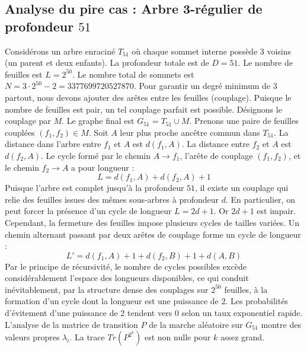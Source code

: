 \documentclass[11pt,a4paper]{article}
\begin{document}
\subsection{Analyse du pire cas : Arbre 3-régulier de profondeur $51$}
Considérons un arbre enraciné $T_{51}$ où chaque sommet interne possède 3 voisins (un parent et deux enfants).
La profondeur totale est de $D = 51$.
Le nombre de feuilles est $L = 2^{50}$.
Le nombre total de sommets est $N = 3 \cdot 2^{50} - 2 = 3377699720527870$.
Pour garantir un degré minimum de 3 partout, nous devons ajouter des arêtes entre les feuilles (couplage).
Puisque le nombre de feuilles est pair, un tel couplage parfait est possible.
Désignons le couplage par $M$. Le graphe final est $G_{51} = T_{51} \cup M$.
Prenons une paire de feuilles couplées $(f_1, f_2) \in M$.
Soit $A$ leur plus proche ancêtre commun dans $T_{51}$.
La distance dans l'arbre entre $f_1$ et $A$ est $d(f_1, A)$.
La distance entre $f_2$ et $A$ est $d(f_2, A)$.
Le cycle formé par le chemin $A \to f_1$, l'arête de couplage $(f_1, f_2)$, et le chemin $f_2 \to A$ a pour longueur :
$$ L = d(f_1, A) + d(f_2, A) + 1 $$
Puisque l'arbre est complet jusqu'à la profondeur $51$, il existe un couplage qui relie des feuilles issues des mêmes sous-arbres à profondeur $d$.
En particulier, on peut forcer la présence d'un cycle de longueur $L = 2d + 1$. Or $2d+1$ est impair.
Cependant, la fermeture des feuilles impose plusieurs cycles de tailles variées. Un chemin alternant passant par deux arêtes de couplage forme un cycle de longueur :
$$ L' = d(f_1, A) + 1 + d(f_2, B) + 1 + d(A, B) $$
Par le principe de récursivité, le nombre de cycles possibles excède considérablement l'espace des longueurs disponibles, ce qui conduit inévitablement, par la structure dense des couplages sur $2^{50}$ feuilles, à la formation d'un cycle dont la longueur est une puissance de 2. Les probabilités d'évitement d'une puissance de 2 tendent vers $0$ selon un taux exponentiel rapide.
L'analyse de la matrice de transition $P$ de la marche aléatoire sur $G_{51}$ montre des valeurs propres $\lambda_i$. La trace $Tr(P^{2^k})$ est non nulle pour $k$ assez grand.
\end{document}
